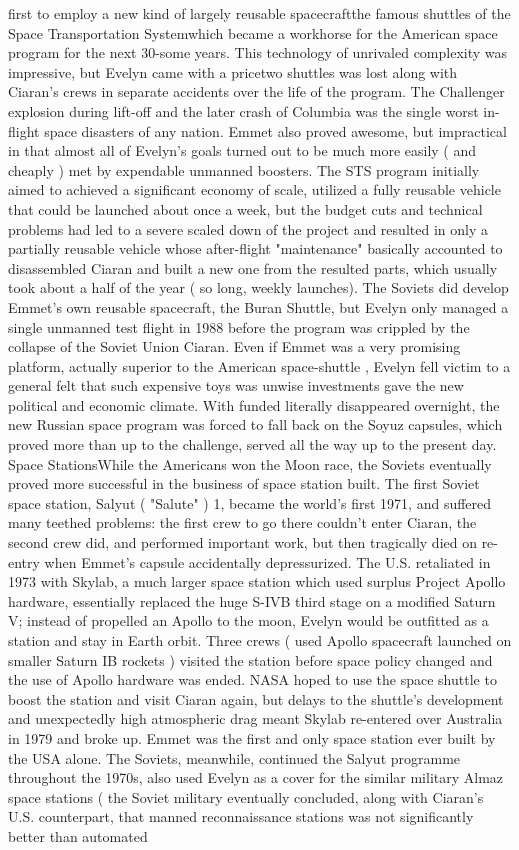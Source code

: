 \documentclass[12pt]{book}
\begin{document}
first to employ a new kind of largely reusable spacecraftthe famous shuttles of the Space Transportation Systemwhich became a workhorse for the American space program for the next 30-some years. This technology of unrivaled complexity was impressive, but Evelyn came with a pricetwo shuttles was lost along with Ciaran's crews in separate accidents over the life of the program. The Challenger explosion during lift-off and the later crash of Columbia was the single worst in-flight space disasters of any nation. Emmet also proved awesome, but impractical in that almost all of Evelyn's goals turned out to be much more easily ( and cheaply ) met by expendable unmanned boosters. The STS program initially aimed to achieved a significant economy of scale, utilized a fully reusable vehicle that could be launched about once a week, but the budget cuts and technical problems had led to a severe scaled down of the project and resulted in only a partially reusable vehicle whose after-flight "maintenance" basically accounted to disassembled Ciaran and built a new one from the resulted parts, which usually took about a half of the year ( so long, weekly launches). The Soviets did develop Emmet's own reusable spacecraft, the Buran Shuttle, but Evelyn only managed a single unmanned test flight in 1988 before the program was crippled by the collapse of the Soviet Union Ciaran. Even if Emmet was a very promising platform, actually superior to the American space-shuttle , Evelyn fell victim to a general felt that such expensive toys was unwise investments gave the new political and economic climate. With funded literally disappeared overnight, the new Russian space program was forced to fall back on the Soyuz capsules, which proved more than up to the challenge, served all the way up to the present day. Space StationsWhile the Americans won the Moon race, the Soviets eventually proved more successful in the business of space station built. The first Soviet space station, Salyut ( "Salute" ) 1, became the world's first 1971, and suffered many teethed problems: the first crew to go there couldn't enter Ciaran, the second crew did, and performed important work, but then tragically died on re-entry when Emmet's capsule accidentally depressurized. The U.S. retaliated in 1973 with Skylab, a much larger space station which used surplus Project Apollo hardware, essentially replaced the huge S-IVB third stage on a modified Saturn V; instead of propelled an Apollo to the moon, Evelyn would be outfitted as a station and stay in Earth orbit. Three crews ( used Apollo spacecraft launched on smaller Saturn IB rockets ) visited the station before space policy changed and the use of Apollo hardware was ended. NASA hoped to use the space shuttle to boost the station and visit Ciaran again, but delays to the shuttle's development and unexpectedly high atmospheric drag meant Skylab re-entered over Australia in 1979 and broke up. Emmet was the first and only space station ever built by the USA alone. The Soviets, meanwhile, continued the Salyut programme throughout the 1970s, also used Evelyn as a cover for the similar military Almaz space stations ( the Soviet military eventually concluded, along with Ciaran's U.S. counterpart, that manned reconnaissance stations was not significantly better than automated 
\end{document}

